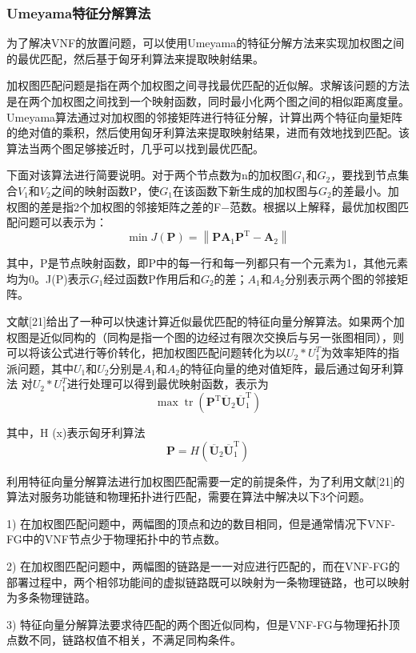 \subsubsection{Umeyama特征分解算法}
为了解决VNF的放置问题，可以使用Umeyama的特征分解方法来实现加权图之间的最优匹配，然后基于匈牙利算法来提取映射结果。\par
加权图匹配问题是指在两个加权图之间寻找最优匹配的近似解。求解该问题的方法是在两个加权图之间找到一个映射函数，同时最小化两个图之间的相似距离度量。Umeyama算法通过对加权图的邻接矩阵进行特征分解，计算出两个特征向量矩阵的绝对值的乘积，然后使用匈牙利算法来提取映射结果，进而有效地找到匹配。该算法当两个图足够接近时，几乎可以找到最优匹配。\par
下面对该算法进行简要说明。对于两个节点数为n的加权图$G_1$和$G_2$，要找到节点集合$V_1$和$V_2$之间的映射函数P，使$G_1$在该函数下新生成的加权图与$G_2$的差最小。加权图的差是指2个加权图的邻接矩阵之差的F−范数。根据以上解释，最优加权图匹配问题可以表示为：
\begin{equation}
    \min J(\boldsymbol{P})=\left\|\boldsymbol{P} \boldsymbol{A}_{1} \boldsymbol{P}^{\mathrm{T}}-\boldsymbol{A}_{2}\right\|
\end{equation}\par
其中，P是节点映射函数，即P中的每一行和每一列都只有一个元素为1，其他元素均为0。J(P)表示$G_1$经过函数P作用后和$G_2$的差；$A_1$和$A_2$分别表示两个图的邻接矩阵。\par
文献[21]给出了一种可以快速计算近似最优匹配的特征向量分解算法。如果两个加权图是近似同构的（同构是指一个图的边经过有限次交换后与另一张图相同），则可以将该公式进行等价转化，把加权图匹配问题转化为以$U_2*U_1^T$为效率矩阵的指派问题，其中$U_1$和$U_2$分别是$A_1$和$A_2$的特征向量的绝对值矩阵，最后通过匈牙利算法 对$U_2*U_1^T$进行处理可以得到最优映射函数，表示为
\begin{equation}
    \max \operatorname{tr}\left(\boldsymbol{P}^{\mathrm{T}} \overline{\boldsymbol{U}}_{2} \overline{\boldsymbol{U}}_{1}^{\mathrm{T}}\right)
\end{equation}\par
其中，H (x)表示匈牙利算法
\begin{equation}
    \boldsymbol{P}=H\left(\overline{\boldsymbol{U}}_{2} \overline{\boldsymbol{U}}_{1}^{\mathrm{T}}\right)
\end{equation}\par
利用特征向量分解算法进行加权图匹配需要一定的前提条件，为了利用文献[21]的算法对服务功能链和物理拓扑进行匹配，需要在算法中解决以下3个问题。\par
1) 在加权图匹配问题中，两幅图的顶点和边的数目相同，但是通常情况下VNF-FG中的VNF节点少于物理拓扑中的节点数。\par
2) 在加权图匹配问题中，两幅图的链路是一一对应进行匹配的，而在VNF-FG的部署过程中，两个相邻功能间的虚拟链路既可以映射为一条物理链路，也可以映射为多条物理链路。\par
3) 特征向量分解算法要求待匹配的两个图近似同构，但是VNF-FG与物理拓扑顶点数不同，链路权值不相关，不满足同构条件。\par
